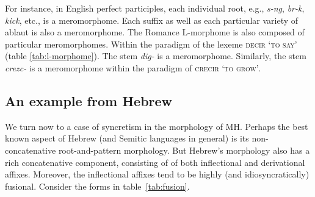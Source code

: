 For instance, in English perfect participles, each individual root, e.g., \textit{s-ng}, 
\textit{br-k}, \textit{kick}, etc., is a meromorphome. Each suffix 
as well as each particular variety of ablaut is also a meromorphome. 
The Romance L-morphome is also composed of particular meromorphomes. 
Within the paradigm of the lexeme \textsc{decir} \textsc{`to say'} 
(table \ref{tab:l-morphome}). The stem \textit{dig-} is a meromorphome. 
Similarly, the stem \textit{crezc-} is a meromorphome within the paradigm of 
\textsc{crecir} \textsc{`to grow'}.

\begin{table}[ht]
\begin{center}
\label{tab:fusion}
\caption{Fusional suffixes in Hebrew nominals}
\end{center}
\end{table}

\subsection{An example from Hebrew}
\label{sec:heb-example}
We turn now to a case of syncretism in the morphology of \ac{MH}. Perhaps
the best known aspect of Hebrew (and Semitic languages in general) is its 
non-concatenative root-and-pattern morphology. But 
Hebrew's morphology also has a rich concatenative component, consisting of
of both inflectional and derivational affixes. Moreover, the inflectional affixes tend to be
highly (and idiosyncratically) fusional.  
Consider the forms in table~\ref{tab:fusion}. 

